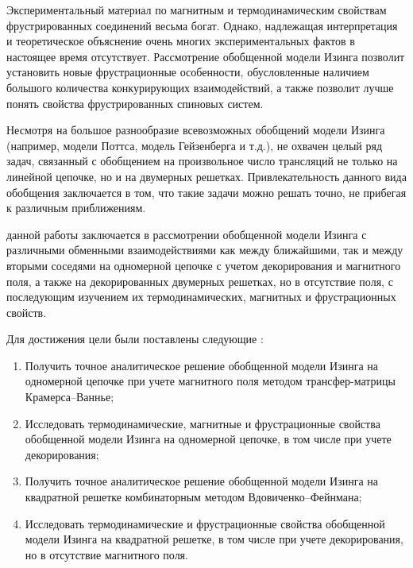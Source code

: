 {\actuality}\newline\indent
Экспериментальный материал по магнитным и термодинамическим свойствам фрустрированных соединений весьма богат. Однако, надлежащая интерпретация и теоретическое объяснение очень многих экспериментальных фактов в настоящее время отсутствует. Рассмотрение обобщенной модели Изинга позволит установить новые фрустрационные особенности, обусловленные наличием большого количества конкурирующих взаимодействий, а также позволит лучше понять свойства фрустрированных спиновых систем.

{\progress}\newline\indent
Несмотря на большое разнообразие всевозможных обобщений модели Изинга (например, модели Поттса, модель Гейзенберга и т.д.), не охвачен целый ряд задач, связанный с обобщением на произвольное число трансляций не только на линейной цепочке, но и на двумерных решетках. Привлекательность данного вида обобщения заключается в том, что такие задачи можно решать точно, не прибегая к различным приближениям.

{\aim} данной работы заключается в рассмотрении обобщенной модели Изинга с различными обменными взаимодействиями как между ближайшими, так и между вторыми соседями на одномерной цепочке с учетом декорирования и магнитного поля, а также на декорированных двумерных решетках, но в отсутствие поля, с последующим изучением их термодинамических, магнитных и фрустрационных свойств.

Для достижения цели были поставлены следующие {\tasks}:
\begin{enumerate}[beginpenalty=10000] %
  \item Получить точное аналитическое решение обобщенной модели Изинга на одномерной цепочке при учете магнитного поля методом трансфер-матрицы Крамерса--Ваннье;
  \item Исследовать термодинамические, магнитные и фрустрационные свойства обобщенной модели Изинга на одномерной цепочке, в том числе при учете декорирования; 
  \item Получить точное аналитическое решение обобщенной модели Изинга на квадратной решетке комбинаторным методом Вдовиченко--Фейнмана;
  \item Исследовать термодинамические и фрустрационные свойства обобщенной модели Изинга на квадратной решетке, в том числе при учете декорирования, но в отсутствие магнитного поля.
\end{enumerate}

